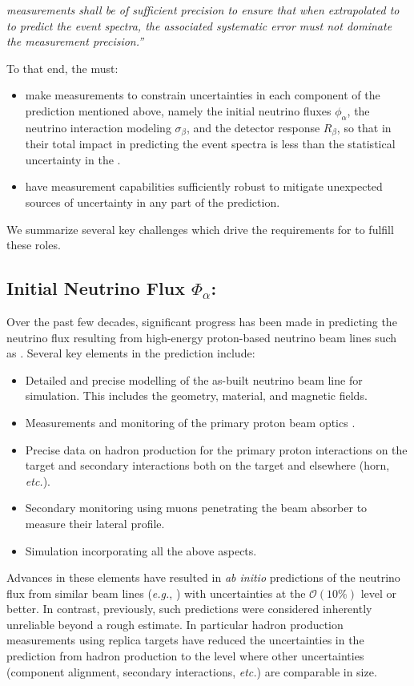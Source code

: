 {\em {} measurements shall be of sufficient precision to ensure that when extrapolated to  to predict the  event spectra, the associated systematic error must not dominate the measurement precision.''}

To that end, the  must:
\begin{itemize}
    \item make measurements to constrain uncertainties in each component of the  prediction mentioned above, namely the initial neutrino fluxes $\phi_\alpha$, the neutrino interaction modeling $\sigma_\beta$, and the detector response $R_\beta$, so that in their total impact in predicting the  event spectra is less than the statistical uncertainty in the . 
    \item have measurement capabilities sufficiently robust to mitigate unexpected sources of uncertainty in any part of the prediction. 
\end{itemize}

We summarize several key challenges which drive the requirements for  to fulfill these roles.

\subsection{Initial Neutrino Flux $\Phi_\alpha$:}
Over the past few decades, significant progress has been made in predicting the neutrino flux resulting from high-energy proton-based neutrino beam lines such as . Several key elements in the prediction include:
\begin{itemize}
\item Detailed and precise modelling of the as-built neutrino beam line for simulation. This includes the geometry, material, and magnetic fields.
\item Measurements and monitoring of the primary proton beam optics .
\item Precise data on hadron production for the primary proton interactions on the target and secondary interactions both on the target and elsewhere (horn, {\em etc.}).
\item Secondary monitoring using muons penetrating the beam absorber to measure their lateral profile. 
\item Simulation incorporating all the above aspects.
\end{itemize}
Advances in these elements have resulted in  {\em ab initio} predictions of the neutrino flux from similar beam lines ({\em e.g.}, ) with uncertainties at the $\mathcal{O}(10\%)$ level or better. In contrast, previously, such predictions were considered inherently unreliable beyond a rough estimate. In particular hadron production measurements using replica targets have reduced the uncertainties in the prediction from hadron production to the level where other uncertainties (component alignment, secondary interactions, {\em etc.}) are comparable in size. 

